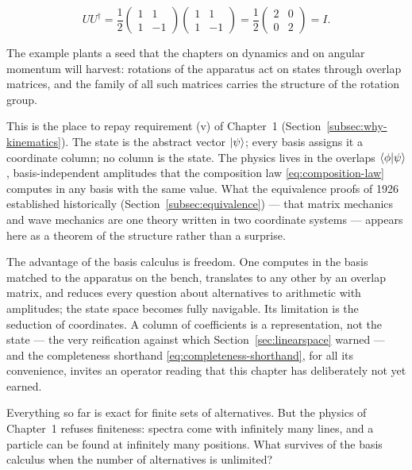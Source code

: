 \begin{linenomath}
    \begin{equation*}
        U U^{\dagger}
        = \frac{1}{2}
        \begin{pmatrix}
            1 &  1 \\
            1 & -1
        \end{pmatrix}
        \begin{pmatrix}
            1 &  1 \\
            1 & -1
        \end{pmatrix}
        = \frac{1}{2}
        \begin{pmatrix}
            2 & 0 \\
            0 & 2
        \end{pmatrix}
        = I .
    \end{equation*}
\end{linenomath} The example plants a seed that the chapters on dynamics and on angular momentum will harvest: rotations of the apparatus act on states through overlap matrices, and the family of all such matrices carries the structure of the rotation group.

This is the place to repay requirement (v) of Chapter~1 (Section~\ref{subsec:why-kinematics}). The state is the abstract vector $\ket{\psi}$; every basis assigns it a coordinate column; no column is the state. The physics lives in the overlaps $\braket{\phi|\psi}$, basis-independent amplitudes that the composition law \eqref{eq:composition-law} computes in any basis with the same value. What the equivalence proofs of 1926 established historically (Section~\ref{subsec:equivalence}) --- that matrix mechanics and wave mechanics are one theory written in two coordinate systems --- appears here as a theorem of the structure rather than a surprise.

The advantage of the basis calculus is freedom. One computes in the basis matched to the apparatus on the bench, translates to any other by an overlap matrix, and reduces every question about alternatives to arithmetic with amplitudes; the state space becomes fully navigable. Its limitation is the seduction of coordinates. A column of coefficients is a representation, not the state --- the very reification against which Section~\ref{sec:linearspace} warned --- and the completeness shorthand \eqref{eq:completeness-shorthand}, for all its convenience, invites an operator reading that this chapter has deliberately not yet earned.

Everything so far is exact for finite sets of alternatives. But the physics of Chapter~1 refuses finiteness: spectra come with infinitely many lines, and a particle can be found at infinitely many positions. What survives of the basis calculus when the number of alternatives is unlimited?

